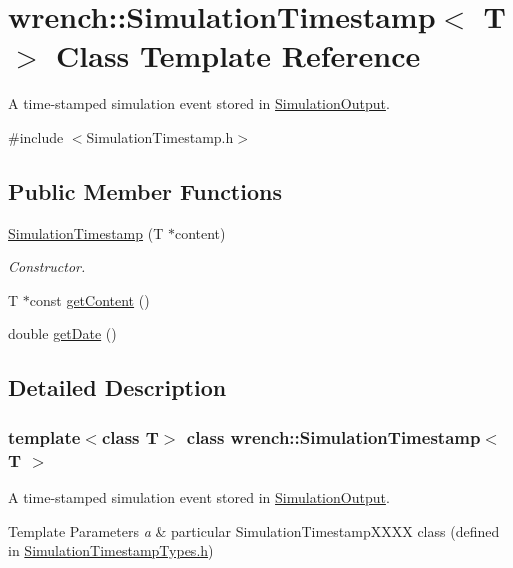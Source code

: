 \hypertarget{classwrench_1_1_simulation_timestamp}{}\section{wrench\+:\+:Simulation\+Timestamp$<$ T $>$ Class Template Reference}
\label{classwrench_1_1_simulation_timestamp}


A time-\/stamped simulation event stored in \hyperlink{classwrench_1_1_simulation_output}{Simulation\+Output}.  




{\ttfamily \#include $<$Simulation\+Timestamp.\+h$>$}

\subsection*{Public Member Functions}
\begin{DoxyCompactItemize}
\item 
\hyperlink{classwrench_1_1_simulation_timestamp_ad09714038c918230df20966d78b0201e}{Simulation\+Timestamp} (T $\ast$content)
\begin{DoxyCompactList}\small\item\em Constructor. \end{DoxyCompactList}\item 
T $\ast$const \hyperlink{classwrench_1_1_simulation_timestamp_a8ae8b15faae854fb1615a700fd620ab8}{get\+Content} ()
\item 
double \hyperlink{classwrench_1_1_simulation_timestamp_a706030fdac38ad1e853e588f7260c499}{get\+Date} ()
\end{DoxyCompactItemize}


\subsection{Detailed Description}
\subsubsection*{template$<$class T$>$\newline
class wrench\+::\+Simulation\+Timestamp$<$ T $>$}

A time-\/stamped simulation event stored in \hyperlink{classwrench_1_1_simulation_output}{Simulation\+Output}. 


\begin{DoxyTemplParams}{Template Parameters}
{\em a} & particular Simulation\+Timestamp\+X\+X\+XX class (defined in \hyperlink{_simulation_timestamp_types_8h_source}{Simulation\+Timestamp\+Types.\+h}) \\
\hline
\end{DoxyTemplParams}



